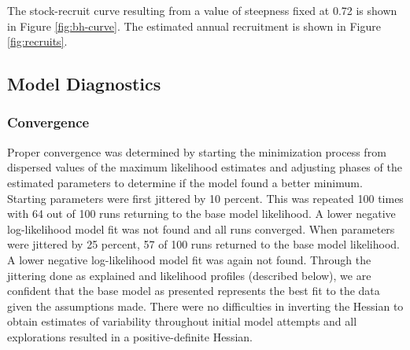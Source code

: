 \documentclass[11pt,
  english,
  a4paper,
]{article}
\begin{document}
\leavevmode\tagmcend\tagstructend\par


The stock-recruit curve resulting from a value of steepness fixed at 0.72 is shown in Figure \ref{fig:bh-curve}. The estimated annual recruitment is shown in Figure \ref{fig:recruits}.

\leavevmode\tagmcend\tagstructend\par


\hypertarget{model-diagnostics}{%
\subsection{Model Diagnostics}\label{model-diagnostics}}

\leavevmode\tagmcend\tagstructend


\hypertarget{convergence}{%
\subsubsection{Convergence}\label{convergence}}

\leavevmode\tagmcend\tagstructend


Proper convergence was determined by starting the minimization process from dispersed values of the maximum likelihood estimates and adjusting phases of the estimated parameters to determine if the model found a better minimum. Starting parameters were first jittered by 10 percent. This was repeated 100 times with 64 out of 100 runs returning to the base model likelihood. A lower negative log-likelihood model fit was not found and all runs converged. When parameters were jittered by 25 percent, 57 of 100 runs returned to the base model likelihood. A lower negative log-likelihood model fit was again not found. Through the jittering done as explained and likelihood profiles (described below), we are confident that the base model as presented represents the best fit to the data given the assumptions made. There were no difficulties in inverting the Hessian to obtain estimates of variability throughout initial model attempts and all explorations resulted in a positive-definite Hessian.

\leavevmode\tagmcend\tagstructend\par
\end{document}
